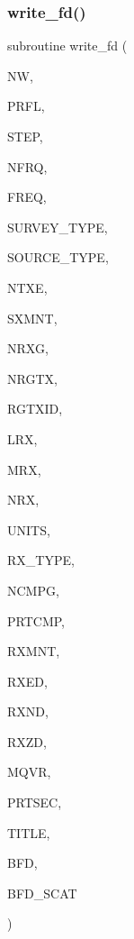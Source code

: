 \subsubsection{\texorpdfstring{write\+\_\+fd()}{write\_fd()}}
{\footnotesize\ttfamily subroutine write\+\_\+fd (\begin{DoxyParamCaption}\item[{integer}]{NW,  }\item[{integer}]{P\+R\+FL,  }\item[{integer}]{S\+T\+EP,  }\item[{integer}]{N\+F\+RQ,  }\item[{real, dimension(nfrq)}]{F\+R\+EQ,  }\item[{integer}]{S\+U\+R\+V\+E\+Y\+\_\+\+T\+Y\+PE,  }\item[{integer}]{S\+O\+U\+R\+C\+E\+\_\+\+T\+Y\+PE,  }\item[{integer}]{N\+T\+XE,  }\item[{real, dimension(ntxe)}]{S\+X\+M\+NT,  }\item[{integer}]{N\+R\+XG,  }\item[{integer, dimension(ntxe)}]{N\+R\+G\+TX,  }\item[{integer, dimension(nrxg,ntxe)}]{R\+G\+T\+X\+ID,  }\item[{integer}]{L\+RX,  }\item[{integer}]{M\+RX,  }\item[{integer, dimension(nrxg)}]{N\+RX,  }\item[{integer, dimension(nrxg)}]{U\+N\+I\+TS,  }\item[{integer, dimension(nrxg)}]{R\+X\+\_\+\+T\+Y\+PE,  }\item[{integer, dimension(nrxg)}]{N\+C\+M\+PG,  }\item[{integer, dimension(10,nrxg)}]{P\+R\+T\+C\+MP,  }\item[{real, dimension(mrx,nrxg)}]{R\+X\+M\+NT,  }\item[{real(kind=8), dimension (mrx,nrxg,mqvr)}]{R\+X\+ED,  }\item[{real(kind=8), dimension (mrx,nrxg,mqvr)}]{R\+X\+ND,  }\item[{real(kind=8), dimension (mrx,nrxg,mqvr)}]{R\+X\+ZD,  }\item[{integer}]{M\+Q\+VR,  }\item[{logical}]{P\+R\+T\+S\+EC,  }\item[{character(len=120)}]{T\+I\+T\+LE,  }\item[{complex, dimension(nfrq,lrx,ntxe,3)}]{B\+FD,  }\item[{complex, dimension(nfrq,lrx,ntxe,3)}]{B\+F\+D\+\_\+\+S\+C\+AT }\end{DoxyParamCaption})}

